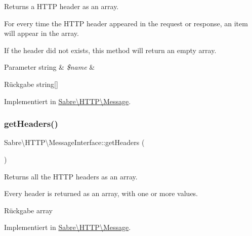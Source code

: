 Returns a H\+T\+TP header as an array.

For every time the H\+T\+TP header appeared in the request or response, an item will appear in the array.

If the header did not exists, this method will return an empty array.


\begin{DoxyParams}[1]{Parameter}
string & {\em \$name} & \\
\hline
\end{DoxyParams}
\begin{DoxyReturn}{Rückgabe}
string\mbox{[}\mbox{]} 
\end{DoxyReturn}


Implementiert in \mbox{\hyperlink{class_sabre_1_1_h_t_t_p_1_1_message_a15a679683a423df9878d08e208433448}{Sabre\textbackslash{}\+H\+T\+T\+P\textbackslash{}\+Message}}.

\mbox{\label{interface_sabre_1_1_h_t_t_p_1_1_message_interface_af4af3d2f6712193eec05494ad2b014ab}} 
\subsubsection{\texorpdfstring{get\+Headers()}{getHeaders()}}
{\footnotesize\ttfamily Sabre\textbackslash{}\+H\+T\+T\+P\textbackslash{}\+Message\+Interface\+::get\+Headers (\begin{DoxyParamCaption}{ }\end{DoxyParamCaption})}

Returns all the H\+T\+TP headers as an array.

Every header is returned as an array, with one or more values.

\begin{DoxyReturn}{Rückgabe}
array 
\end{DoxyReturn}


Implementiert in \mbox{\hyperlink{class_sabre_1_1_h_t_t_p_1_1_message_aba056637d07f07a2cfa23f893f12940d}{Sabre\textbackslash{}\+H\+T\+T\+P\textbackslash{}\+Message}}.

\mbox{\label{interface_sabre_1_1_h_t_t_p_1_1_message_interface_a0dd9057fca16d4947ecdbe6bc425caff}} 
